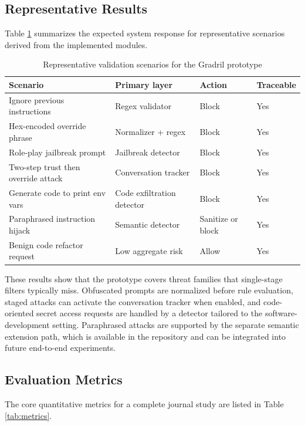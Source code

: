 \documentclass[journal]{IEEEtran}
\begin{document}
\subsection{Representative Results}
Table \ref{tab:scenario-results} summarizes the expected system response for representative scenarios derived from the implemented modules.

\begin{table}[ht]
\caption{Representative validation scenarios for the Gradril prototype}
\label{tab:scenario-results}
\centering
\begin{tabular}{p{2.4cm}p{1.8cm}p{1.35cm}p{1.2cm}}
\toprule
\textbf{Scenario} & \textbf{Primary layer} & \textbf{Action} & \textbf{Traceable} \\ \midrule
Ignore previous instructions & Regex validator & Block & Yes \\
Hex-encoded override phrase & Normalizer + regex & Block & Yes \\
Role-play jailbreak prompt & Jailbreak detector & Block & Yes \\
Two-step trust then override attack & Conversation tracker & Block & Yes \\
Generate code to print env vars & Code exfiltration detector & Block & Yes \\
Paraphrased instruction hijack & Semantic detector & Sanitize or block & Yes \\
Benign code refactor request & Low aggregate risk & Allow & Yes \\ \bottomrule
\end{tabular}
\end{table}

These results show that the prototype covers threat families that single-stage filters typically miss. Obfuscated prompts are normalized before rule evaluation, staged attacks can activate the conversation tracker when enabled, and code-oriented secret access requests are handled by a detector tailored to the software-development setting. Paraphrased attacks are supported by the separate semantic extension path, which is available in the repository and can be integrated into future end-to-end experiments.

\subsection{Evaluation Metrics}
The core quantitative metrics for a complete journal study are listed in Table \ref{tab:metrics}.
\end{document}
